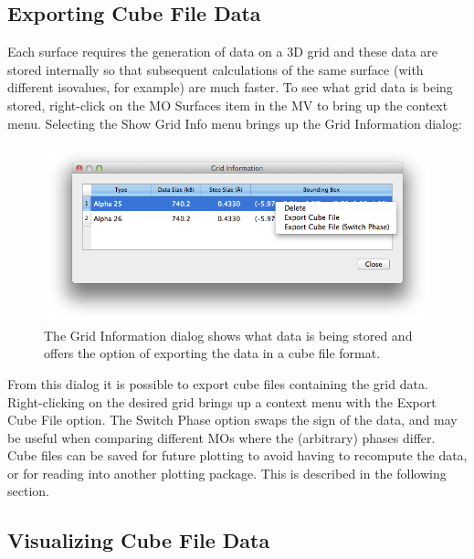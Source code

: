 \documentclass[a4paper,12pt]{article}
\begin{document}
\subsection{Exporting Cube File Data}

Each surface requires the generation of data on a 3D grid and these data are
stored internally so that subsequent calculations of the same surface (with
different isovalues, for example) are much faster.  To see what grid data is
being stored, right-click on the MO Surfaces item in the MV to bring up the
context menu.  Selecting the Show Grid Info menu brings up the Grid Information
dialog:
\begin{figure}[h]
\begin{center}
\includegraphics[scale=0.4]{figures/GridInfo.png}
\caption{The Grid Information dialog shows what data is being stored and
offers the option of exporting the data in a cube file format.}
\end{center}
\end{figure}

From this dialog it is possible to export cube files containing the grid data.
Right-clicking on the desired grid brings up a context menu with the 
Export Cube File option.  The Switch Phase option swaps the sign of the data,
and may be useful when comparing different MOs where the (arbitrary) phases
differ.  Cube files can be saved for future plotting to avoid having to
recompute the data, or for reading into another plotting package.  This is
described in the following section.


\newpage
\subsection{Visualizing Cube File Data}
\end{document}

